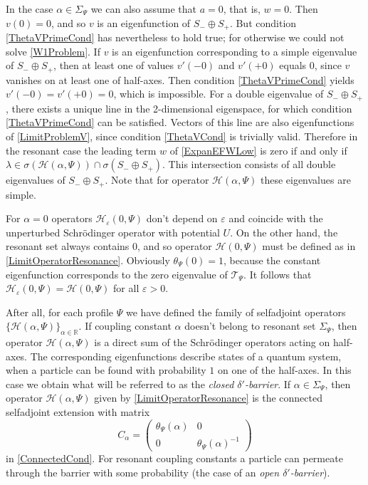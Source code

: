 \documentclass[11pt,english]{amsart}%
\begin{document}
\begin{g_remark}\rm \label{RemarkV(0)=0} In the case $\alpha\in \Sigma_\Psi$ we  can also assume that
 $a=0$, that is, $w=0$.  Then $v(0)=0$, and so  $v$ is an eigenfunction of $S_-\oplus S_+$. But condition \eqref{ThetaVPrimeCond}
has  nevertheless to hold true; for otherwise we could not solve \eqref{W1Problem}.
If $v$ is an eigenfunction corresponding to a simple eigenvalue of $S_-\oplus S_+$, then at least one of values $v'(-0)$ and $v'(+0)$ equals $0$, since $v$ vanishes on at least one of half-axes. Then condition  \eqref{ThetaVPrimeCond}
yields $v'(-0)=v'(+0)=0$, which is impossible.
For a double eigenvalue of  $S_-\oplus S_+$, there exists a unique line in the 2-dimensional eigenspace, for which condition \eqref{ThetaVPrimeCond} can be satisfied.
Vectors of this line are also eigenfunctions of \eqref{LimitProblemV}, since condition \eqref{ThetaVCond}
is trivially valid. Therefore in the resonant case  the leading term  $w$ of \eqref{ExpanEFWLow} is zero if and only if  $\lambda\in\sigma(\mathcal{H}(\alpha,\Psi))\cap\sigma(S_-\oplus S_+)$.
This intersection consists of all double eigenvalues of $S_-\oplus S_+$. Note that for operator $\mathcal{H}(\alpha,\Psi)$ these eigenvalues are simple.
\end{g_remark}



\begin{g_remark}\rm For $\alpha=0$ operators $\mathcal{H_{\varepsilon}}(0,\Psi)$ don't depend on $\varepsilon$ and coincide with the unperturbed  Schr\"{o}dinger operator with potential $U$. On the other hand, the resonant set always contains
 $0$, and so operator $\mathcal{H}(0,\Psi)$ must be defined as in \eqref{LimitOperatorResonance}.
Obviously $\theta_\Psi (0)=1$, because the constant eigenfunction corresponds to the zero eigenvalue of
$\mathcal{T}_\Psi$. It follows that  $\mathcal{H_{\varepsilon}}(0,\Psi)=\mathcal{H}(0,\Psi)$ for all $\varepsilon>0$.
\end{g_remark}

After all, for each profile $\Psi$ we have defined the family of selfadjoint operators  $\{\mathcal{H}(\alpha,\Psi)\}_{\alpha\in\mathbb{R}}$.
If coupling constant $\alpha$ doesn't belong to resonant set $\Sigma_\Psi$, then operator
$\mathcal{H}(\alpha,\Psi)$ is a direct sum of the Schr\"{o}dinger operators acting on half-axes. The corresponding eigenfunctions describe  states of a quantum system, when a particle can be found with probability $1$ on one of the half-axes. In this case we obtain what will be referred to as the \emph{closed $\delta'$-barrier}.
 If $\alpha\in \Sigma_\Psi$, then operator $\mathcal{H}(\alpha,\Psi)$ given by \eqref{LimitOperatorResonance} is the  connected  selfadjoint extension with  matrix
\begin{equation}\label{MatrixC}
C_\alpha=\begin{pmatrix} \theta_\Psi (\alpha) & 0 \\ 0 & \theta_\Psi (\alpha)^{-1} \end{pmatrix}
\end{equation}
in \eqref{ConnectedCond}. For resonant coupling constants  a particle can permeate through the barrier with some probability  (the case of an \emph{open $\delta'$-barrier}).
\end{document}
